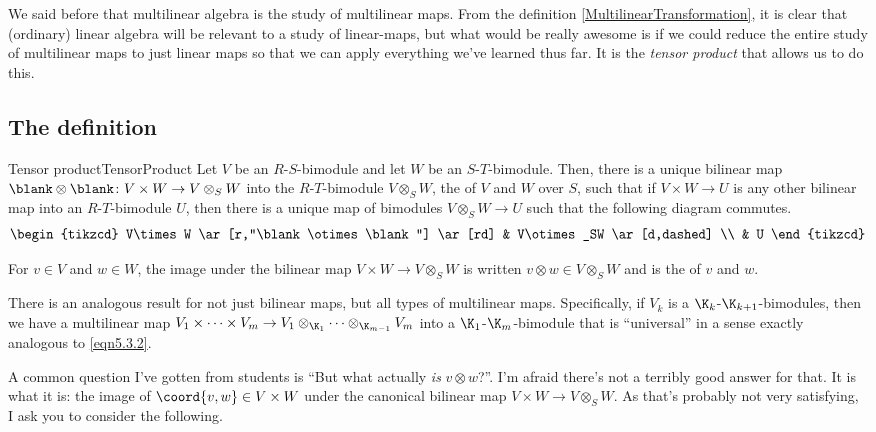 We said before that multilinear algebra is the study of multilinear maps.  From the definition \cref{MultilinearTransformation}, it is clear that (ordinary) linear algebra will be relevant to a study of linear-maps, but what would be really awesome is if we could reduce the entire study of multilinear maps to just linear maps so that we can apply everything we've learned thus far.  It is the \emph{tensor product} that allows us to do this.

\subsection{The definition}

\begin{thm}{Tensor product}{TensorProduct}
	Let $V$ be an $R$-$S$-bimodule and let $W$ be an $S$-$T$-bimodule.  Then, there is a unique bilinear map $\blank \otimes \blank \colon V\times W\rightarrow V\otimes _SW$ into the $R$-$T$-bimodule $V\otimes _SW$, the  of $V$ and $W$ over $S$, such that if $V\times W\rightarrow U$ is any other bilinear map into an $R$-$T$-bimodule $U$, then there is a unique map of bimodules $V\otimes _SW\rightarrow U$ such that the following diagram commutes.
	\begin{equation}\label{eqn5.3.2}
		\begin{tikzcd}
			V\times W \ar[r,"\blank \otimes \blank "] \ar[rd] & V\otimes _SW \ar[d,dashed] \\
			& U
		\end{tikzcd}
	\end{equation}
	\begin{rmk}
		For $v\in V$ and $w\in W$, the image under the bilinear map $V\times W\rightarrow V\otimes _SW$ is written $v\otimes w\in V\otimes _SW$ and is the  of $v$ and $w$.
	\end{rmk}
	\begin{rmk}
		There is an analogous result for not just bilinear maps, but all types of multilinear maps.  Specifically, if $V_k$ is a $\K _k$-$\K _{k+1}$-bimodules, then we have a multilinear map $V_1\times \cdots \times V_m\rightarrow V_1\otimes _{\K _1}\cdots \otimes _{\K _{m-1}}V_m$ into a $\K _1$-$\K _m$-bimodule that is ``universal'' in a sense exactly analogous to \eqref{eqn5.3.2}.
	\end{rmk}
	\begin{rmk}
		A common question I've gotten from students is ``But what actually \emph{is} $v\otimes w$?''.  I'm afraid there's not a terribly good answer for that.  It is what it is:  the image of $\coord{v,w}\in V\times W$ under the canonical bilinear map $V\times W\rightarrow V\otimes _SW$.  As that's probably not very satisfying, I ask you to consider the following.
		

\end{rmk}
\end{thm}
